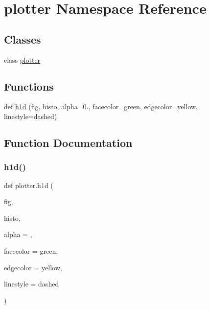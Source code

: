 \hypertarget{namespaceplotter}{}\section{plotter Namespace Reference}
\label{namespaceplotter}
\subsection*{Classes}
\begin{DoxyCompactItemize}
\item 
class \hyperlink{classplotter_1_1plotter}{plotter}
\end{DoxyCompactItemize}
\subsection*{Functions}
\begin{DoxyCompactItemize}
\item 
def \hyperlink{namespaceplotter_a5d9521541ff0c72bf439078efacf2f42}{h1d} (fig, histo, alpha=0., facecolor=\textquotesingle{}green\textquotesingle{}, edgecolor=\textquotesingle{}yellow\textquotesingle{}, linestyle=\textquotesingle{}dashed\textquotesingle{})
\end{DoxyCompactItemize}


\subsection{Function Documentation}
\mbox{\label{namespaceplotter_a5d9521541ff0c72bf439078efacf2f42}} 
\subsubsection{\texorpdfstring{h1d()}{h1d()}}
{\footnotesize\ttfamily def plotter.\+h1d (\begin{DoxyParamCaption}\item[{}]{fig,  }\item[{}]{histo,  }\item[{}]{alpha = {},  }\item[{}]{facecolor = {\ttfamily \textquotesingle{}green\textquotesingle{}},  }\item[{}]{edgecolor = {\ttfamily \textquotesingle{}yellow\textquotesingle{}},  }\item[{}]{linestyle = {\ttfamily \textquotesingle{}dashed\textquotesingle{}} }\end{DoxyParamCaption})}



